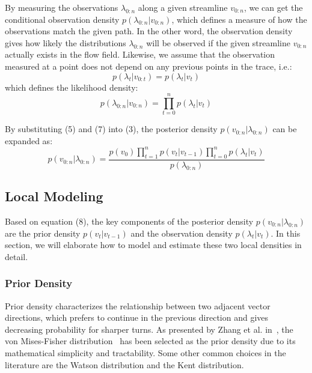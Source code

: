 By measuring the observations $\lambda_{0:n}$ along a given streamline $v_{0:n}$, we can get the conditional observation density $p({\lambda_{0:n}}|v_{0:n})$, which defines a measure of how the observations match the given path. In the other word, the observation density gives how likely the distributions $\lambda_{0:n}$ will be observed if the given streamline $v_{0:n}$ actually exists in the flow field. Likewise, we assume that the observation measured at a point does not depend on any previous points in the trace, i.e.:
\begin{equation}
  p(\lambda_t|v_{0:t}) = p({\lambda_t}|{v_t})
\end{equation}
which defines the likelihood density:
\begin{equation}
  p({\lambda_{0:n}}|{v_{0:n}}) = \prod\limits_{t = 0}^n {p({\lambda_t}|{v_t})}
\end{equation}

By substituting (5) and (7) into (3), the posterior density $p({v_{0:n}}|{\lambda_{0:n}})$ can be expanded as:
\begin{equation}
  p({v_{0:n}}|{\lambda_{0:n}}) = \frac{{p({v_0})\prod\limits_{t = 1}^n {p({v_t}|{v_{t - 1}})} \prod\limits_{t = 0}^n {p({\lambda_t}|{v_t})} }}{{p({\lambda_{0:n}})}}
\end{equation}

\subsection{Local Modeling}

Based on equation (8), the key components of the posterior density $p({v_{0:n}}|{\lambda_{0:n}})$ are the prior density ${p({v_t}|{v_{t - 1}})}$ and the observation density ${p({\lambda_t}|{v_t})}$. In this section, we will elaborate how to model and estimate these two local densities in detail.

\subsubsection{Prior Density}

Prior density characterizes the relationship between two adjacent vector directions, which prefers to continue in the previous direction and gives decreasing probability for sharper turns. As presented by Zhang et al. in~\cite{Zhang20095}, the von Mises-Fisher distribution~\cite{fisher} has been selected as the prior density due to its mathematical simplicity and tractability. Some other common choices in the literature are the Watson distribution and the Kent distribution.

